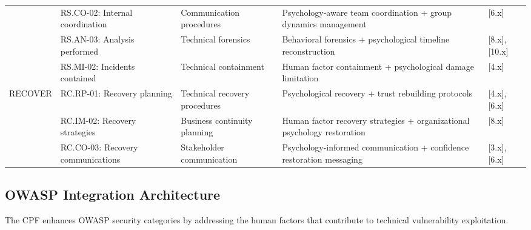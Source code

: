 \documentclass[10pt,twocolumn]{IEEEtran}
\begin{document}
\begin{table*}[t]
\begin{tabular}{@{}p{2cm}p{3cm}p{4cm}p{4cm}p{3cm}@{}}
& RS.CO-02: Internal coordination & Communication procedures & Psychology-aware team coordination + group dynamics management & [6.x] \\
& RS.AN-03: Analysis performed & Technical forensics & Behavioral forensics + psychological timeline reconstruction & [8.x], [10.x] \\
& RS.MI-02: Incidents contained & Technical containment & Human factor containment + psychological damage limitation & [4.x] \\
\midrule
\multirow{3}{2cm}{RECOVER}
& RC.RP-01: Recovery planning & Technical recovery procedures & Psychological recovery + trust rebuilding protocols & [4.x], [6.x] \\
& RC.IM-02: Recovery strategies & Business continuity planning & Human factor recovery strategies + organizational psychology restoration & [8.x] \\
& RC.CO-03: Recovery communications & Stakeholder communication & Psychology-informed communication + confidence restoration messaging & [3.x], [6.x] \\
\bottomrule
\end{tabular}
\end{table*}

\subsection{OWASP Integration Architecture}

The CPF enhances OWASP security categories by addressing the human factors that contribute to technical vulnerability exploitation.
\end{document}
